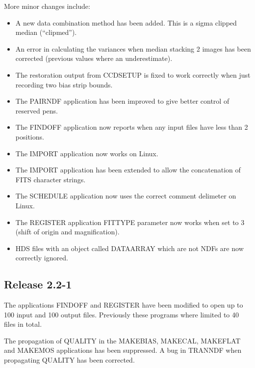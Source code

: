 \documentclass[twoside,11pt]{article}
\newcommand{\htmlref}[2]{#1}
\renewcommand{\_}{\texttt{\symbol{95}}}
\newcommand{\xroutine}[1]{\htmlref{{\sc #1}}{#1}}
\begin{document}
More minor changes include:
\begin{itemize}
\item A new data combination method has been added. This is a 
      sigma clipped median (``clipmed'').

\item An error in calculating the variances when median stacking
      2 images has been corrected (previous values where an
      underestimate).

\item The restoration output from \xroutine{CCDSETUP} is fixed to work
      correctly when just recording two bias strip bounds.

\item The \xroutine{PAIRNDF} application has been improved to give better
      control of reserved pens.

\item The \xroutine{FINDOFF} application now reports when any input files
      have less than 2 positions.

\item The \xroutine{IMPORT} application now works on Linux.

\item The \xroutine{IMPORT} application has been extended to allow the
      concatenation of FITS character strings.

\item The \xroutine{SCHEDULE} application now uses the correct comment
      delimeter on Linux.

\item The \xroutine{REGISTER} application FITTYPE parameter now works when set
      to 3 (shift of origin and magnification).

\item HDS files with an object called DATA\_ARRAY which are not NDFs
      are now correctly ignored.
\end{itemize}

\subsection{Release 2.2-1}
The applications \xroutine{FINDOFF} and \xroutine{REGISTER} have been
modified to open up to 100 input and 100 output files. Previously
these programs where limited to 40 files in total.

The propagation of QUALITY in the \xroutine{MAKEBIAS},
\xroutine{MAKECAL}, \xroutine{MAKEFLAT} and
\xroutine{MAKEMOS} applications has been suppressed. A bug in 
\xroutine{TRANNDF} when
propagating QUALITY has been corrected.
\end{document}
